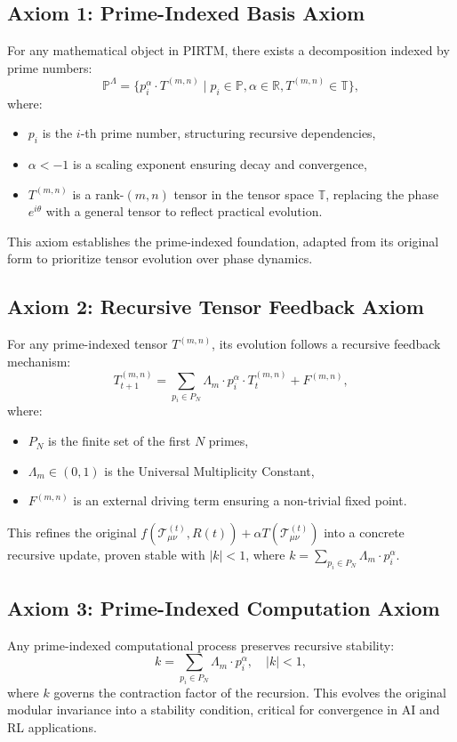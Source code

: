 \documentclass{article}
\theoremstyle{plain}
\begin{document}
\subsection{Axiom 1: Prime-Indexed Basis Axiom}
For any mathematical object in PIRTM, there exists a decomposition indexed by prime numbers:
\begin{equation}
    \mathbb{P}^\Lambda = \{ p_i^\alpha \cdot T^{(m,n)} \mid p_i \in \mathbb{P}, \alpha \in \mathbb{R}, T^{(m,n)} \in \mathbb{T} \},
\end{equation}
where:
\begin{itemize}
    \item \( p_i \) is the \( i \)-th prime number, structuring recursive dependencies,
    \item \( \alpha < -1 \) is a scaling exponent ensuring decay and convergence,
    \item \( T^{(m,n)} \) is a rank-$(m,n)$ tensor in the tensor space \( \mathbb{T} \), replacing the phase \( e^{i\theta} \) with a general tensor to reflect practical evolution.
\end{itemize}
This axiom establishes the prime-indexed foundation, adapted from its original form to prioritize tensor evolution over phase dynamics.

\subsection{Axiom 2: Recursive Tensor Feedback Axiom}
For any prime-indexed tensor \( T^{(m,n)} \), its evolution follows a recursive feedback mechanism:
\begin{equation}
    T_{t+1}^{(m,n)} = \sum_{p_i \in P_N} \Lambda_m \cdot p_i^\alpha \cdot T_t^{(m,n)} + F^{(m,n)},
\end{equation}
where:
\begin{itemize}
    \item \( P_N \) is the finite set of the first \( N \) primes,
    \item \( \Lambda_m \in (0, 1) \) is the Universal Multiplicity Constant,
    \item \( F^{(m,n)} \) is an external driving term ensuring a non-trivial fixed point.
\end{itemize}
This refines the original \( f(\mathcal{T}_{\mu\nu}^{(t)}, R(t)) + \alpha T(\mathcal{T}_{\mu\nu}^{(t)}) \) into a concrete recursive update, proven stable with \( |k| < 1 \), where \( k = \sum_{p_i \in P_N} \Lambda_m \cdot p_i^\alpha \).

\subsection{Axiom 3: Prime-Indexed Computation Axiom}
Any prime-indexed computational process preserves recursive stability:
\begin{equation}
    k = \sum_{p_i \in P_N} \Lambda_m \cdot p_i^\alpha, \quad |k| < 1,
\end{equation}
where \( k \) governs the contraction factor of the recursion. This evolves the original modular invariance into a stability condition, critical for convergence in AI and RL applications.
\end{document}
